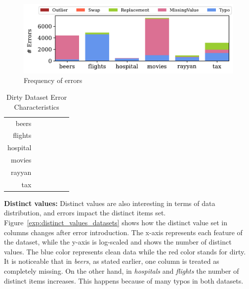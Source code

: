 \begin{figure}[!t]
    \centering
    \includegraphics[width=\textwidth]{figures/plot/error_percent/errors.pdf}
    \caption{Frequency of errors}
    \label{exp:errors_count}
\end{figure}

\begin{table}[!t]
\centering
\caption{\label{tab:dirty_num_errors}Dirty Dataset Error Characteristics}
\begin{tabular}{r|K|K|K|K|K}
\toprule
                     &  &  &              &               &    \\ \midrule
beers                &         &    &            &                 &        \\
flights              &         &   &               &               &        \\
hospital             &         &    &              &                 &        \\
movies               &         &   &            &               &        \\
rayyan               &         &    &              &               &        \\
tax                  &         &   &             &              &        \\ \bottomrule
\end{tabular}
\end{table}

\textbf{Distinct values:} 
Distinct values are also interesting in terms of data distribution, and errors impact the distinct items set.
Figure~\ref{exp:distinct_values_datasets} shows how the distinct value set in columns changes after error introduction. 
The x-axis represents each feature of the dataset, while the y-axis is log-scaled and shows the number of distinct values. 
The blue color represents clean data while the red color stands for dirty.
It is noticeable that in \textit{beers}, as stated earlier, one column is treated as completely missing.
On the other hand, in \textit{hospitals} and \textit{flights} the number of distinct items increases.
This happens because of many typos in both datasets.

